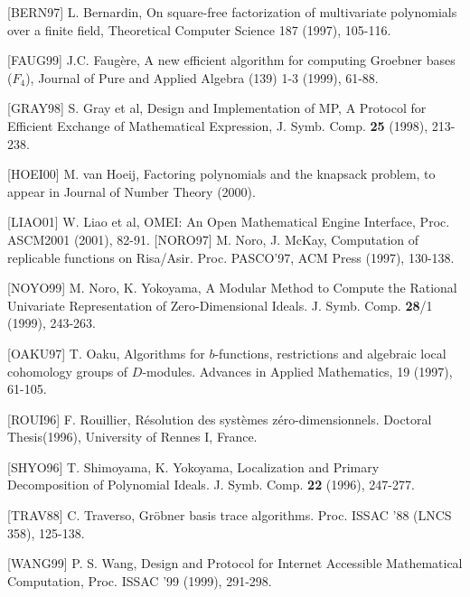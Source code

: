 \documentclass{slides}
\def\gr{Gr\"obner basis }
\begin{document}
\begin{slide}{}

[BERN97] L. Bernardin, On square-free factorization of 
multivariate polynomials over a finite field, Theoretical
Computer Science 187 (1997), 105-116.

[FAUG99] J.C. Faug\`ere,
A new efficient algorithm for computing Groebner bases  ($F_4$),
Journal of Pure and Applied Algebra (139) 1-3 (1999), 61-88.

[GRAY98] S. Gray et al,
Design and Implementation of MP, A Protocol for Efficient Exchange of
Mathematical Expression,
J. Symb. Comp. {\bf 25} (1998), 213-238.

[HOEI00] M. van Hoeij, Factoring polynomials and the knapsack problem,
to appear in Journal of Number Theory (2000).

[LIAO01] W. Liao et al,
OMEI: An Open Mathematical Engine Interface,
Proc. ASCM2001 (2001), 82-91.
[NORO97] M. Noro, J. McKay,
Computation of replicable functions on Risa/Asir.
Proc. PASCO'97, ACM Press (1997), 130-138.
\end{slide}

\begin{slide}{}

[NOYO99] M. Noro, K. Yokoyama, 
A Modular Method to Compute the Rational Univariate
Representation of Zero-Dimensional Ideals.
J. Symb. Comp. {\bf 28}/1 (1999), 243-263.

[OAKU97] T. Oaku, Algorithms for $b$-functions, restrictions and algebraic
local cohomology groups of $D$-modules.
Advances in Applied Mathematics, 19 (1997), 61-105.

[ROUI96] F. Rouillier,
R\'esolution des syst\`emes z\'ero-dimensionnels. 
Doctoral Thesis(1996), University of Rennes I, France.

[SHYO96] T. Shimoyama, K. Yokoyama, Localization and Primary Decomposition of Polynomial Ideals.  J. Symb. Comp. {\bf 22} (1996), 247-277.

[TRAV88] C. Traverso, \gr trace algorithms. Proc. ISSAC '88 (LNCS 358), 125-138.

[WANG99] P. S. Wang,
Design and Protocol for Internet Accessible Mathematical Computation,
Proc. ISSAC '99 (1999), 291-298.
\end{slide}
\end{document}
